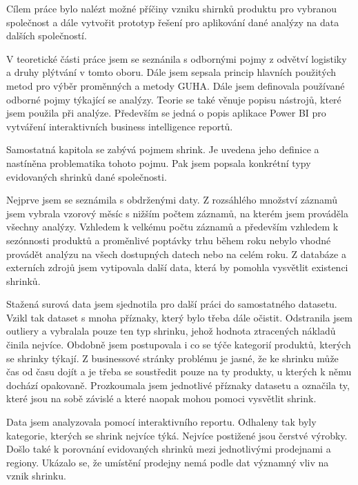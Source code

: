 Cílem práce bylo nalézt možné příčiny vzniku shirnků produktu pro vybranou společnost a dále vytvořit prototyp řešení pro aplikování dané analýzy na data dalších společností.

V teoretické části práce jsem se seznánila s odbornými pojmy z odvětví logistiky a druhy plýtvání v tomto oboru. Dále jsem sepsala princip hlavních použitých metod pro výběr proměnných a metody GUHA. Dále jsem definovala používané odborné pojmy týkající se analýzy. Teorie se také věnuje popisu nástrojů, které jsem použila při analýze. Především se jedná o popis aplikace Power BI pro vytváření interaktivních business intelligence reportů.

Samostatná kapitola se zabývá pojmem shrink. Je uvedena jeho definice a nastíněna problematika tohoto pojmu. Pak jsem popsala konkrétní typy evidovaných shrinků dané společnosti.

Nejprve jsem se seznámila s obdrženými daty. Z rozsáhlého množství záznamů jsem vybrala vzorový měsíc s nižším počtem záznamů, na kterém jsem prováděla všechny analýzy. Vzhledem k velkému počtu záznamů a především vzhledem k sezónnosti produktů a proměnlivé poptávky trhu během roku nebylo vhodné provádět analýzu na všech dostupných datech nebo na celém roku. Z databáze a externích zdrojů jsem vytipovala další data, která by pomohla vysvětlit existenci shrinků.

Stažená surová data jsem sjednotila pro další práci do samostatného datasetu. Vzikl tak dataset s mnoha příznaky, který bylo třeba dále očistit. Odstranila jsem outliery a vybralala pouze ten typ shrinku, jehož hodnota ztracených nákladů činila nejvíce. Obdobně jsem postupovala i co se týče kategorií produktů, kterých se shrinky týkají. Z businessové stránky problému je jasné, že ke shrinku může čas od času dojít a je třeba se soustředit pouze na ty produkty, u kterých k němu dochází opakovaně. 
Prozkoumala jsem jednotlivé příznaky datasetu a označila ty, které jsou na sobě závislé a které naopak mohou pomoci vysvětlit shrink. 

Data jsem analyzovala pomocí interaktivního reportu. Odhaleny tak byly kategorie, kterých se shrink nejvíce týká. Nejvíce postižené jsou čerstvé výrobky. Došlo také k porovnání evidovaných shrinků mezi jednotlivými prodejnami a regiony. Ukázalo se, že umístění prodejny nemá podle dat významný vliv na vznik shrinku. 


